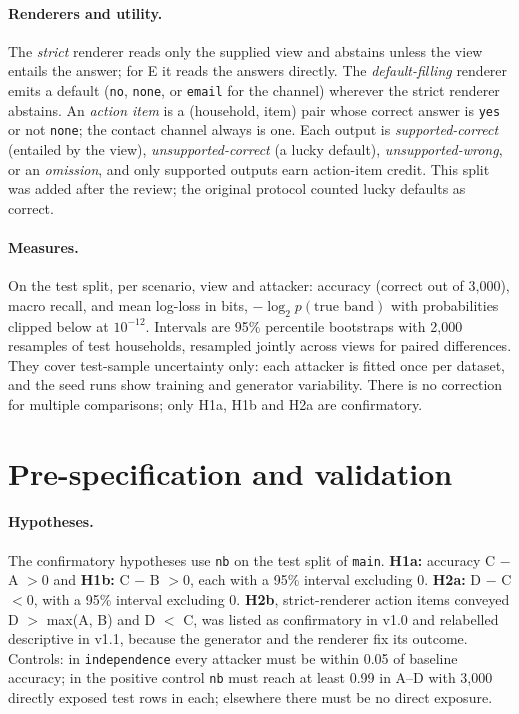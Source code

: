 \documentclass[11pt]{article}
\newcommand{\code}[1]{\texttt{#1}}
\begin{document}
\paragraph{Renderers and utility.} The \emph{strict} renderer reads only the supplied view and abstains unless the view entails the answer; for E it reads the answers directly. The \emph{default-filling} renderer emits a default (\code{no}, \code{none}, or \code{email} for the channel) wherever the strict renderer abstains. An \emph{action item} is a (household, item) pair whose correct answer is \code{yes} or not \code{none}; the contact channel always is one. Each output is \emph{supported-correct} (entailed by the view), \emph{unsupported-correct} (a lucky default), \emph{unsupported-wrong}, or an \emph{omission}, and only supported outputs earn action-item credit. This split was added after the review; the original protocol counted lucky defaults as correct.

\paragraph{Measures.} On the test split, per scenario, view and attacker: accuracy (correct out of 3,000), macro recall, and mean log-loss in bits, $-\log_2 p(\text{true band})$ with probabilities clipped below at $10^{-12}$. Intervals are 95\% percentile bootstraps with 2,000 resamples of test households, resampled jointly across views for paired differences. They cover test-sample uncertainty only: each attacker is fitted once per dataset, and the seed runs show training and generator variability. There is no correction for multiple comparisons; only H1a, H1b and H2a are confirmatory.

\section{Pre-specification and validation}
\label{sec:prespec}

\paragraph{Hypotheses.} The confirmatory hypotheses use \code{nb} on the test split of \code{main}. \textbf{H1a:} accuracy C $-$ A $> 0$ and \textbf{H1b:} C $-$ B $> 0$, each with a 95\% interval excluding 0. \textbf{H2a:} D $-$ C $< 0$, with a 95\% interval excluding 0. \textbf{H2b}, strict-renderer action items conveyed D $>$ max(A, B) and D $<$ C, was listed as confirmatory in v1.0 and relabelled descriptive in v1.1, because the generator and the renderer fix its outcome. Controls: in \code{independence} every attacker must be within 0.05 of baseline accuracy; in the positive control \code{nb} must reach at least 0.99 in A--D with 3,000 directly exposed test rows in each; elsewhere there must be no direct exposure.
\end{document}
